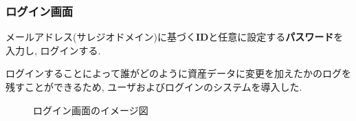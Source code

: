 \documentclass[11ptm]{jsarticle}
\begin{document}
\subsubsection{ログイン画面}
\label{sec:ログイン画面}
メールアドレス(サレジオドメイン)に基づく{\bf ID}と任意に設定する{\bf パスワード}を入力し, ログインする. \par
ログインすることによって誰がどのように資産データに変更を加えたかのログを残すことができるため, ユーザおよびログインのシステムを導入した.
\begin{figure}[h]
  \centering
  \caption{\label{fig:ログイン画面のイメージ図}ログイン画面のイメージ図}
\end{figure}

\clearpage
\end{document}
